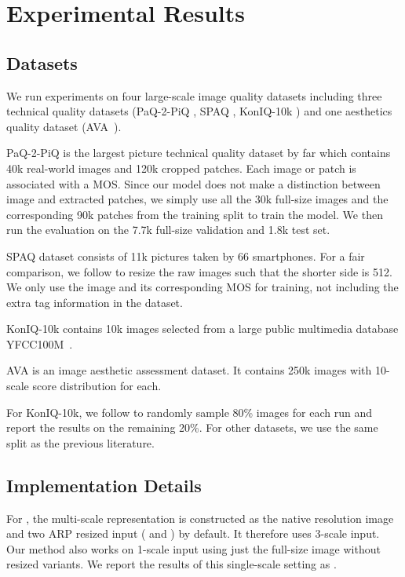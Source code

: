 
\section{Experimental Results}

\subsection{Datasets}
\label{sec:datasets}
\noindent We run experiments on four large-scale image quality datasets including three technical quality datasets (PaQ-2-PiQ \cite{ying2020patches}, SPAQ \cite{fang2020perceptual},  KonIQ-10k \cite{hosu2020koniq}) and one aesthetics quality dataset (AVA~\cite{murray2012ava}).

PaQ-2-PiQ is the largest picture technical quality dataset by far which contains 40k real-world images and 120k cropped patches. Each image or patch is associated with a MOS. Since our model does not make a distinction between image and extracted patches, we simply use all the 30k full-size images and the corresponding 90k patches from the training split to train the model. We then run the evaluation on the 7.7k full-size validation and 1.8k test set.

SPAQ dataset consists of 11k pictures taken by 66 smartphones. For a fair comparison, we follow \cite{fang2020perceptual} to resize the raw images such that the shorter side is 512. We only use the image and its corresponding MOS for training, not including the extra tag information in the dataset.

KonIQ-10k contains 10k images selected from a large public multimedia database YFCC100M~\cite{thomee2016yfcc100m}.

AVA is an image aesthetic assessment dataset. It contains 250k images with 10-scale score distribution for each.

For KonIQ-10k, we follow \cite{zhu2020metaiqa, su2020blindly} to randomly sample 80\% images for each run and report the results on the remaining 20\%. For other datasets, we use the same split as the previous literature.

\subsection{Implementation Details}
\noindent For \ours, the multi-scale representation is constructed as the native resolution image and two ARP resized input ( and ) by default. It therefore uses 3-scale input. Our method also works on 1-scale input using just the full-size image without resized variants. We report the results of this single-scale setting as \fullours.

